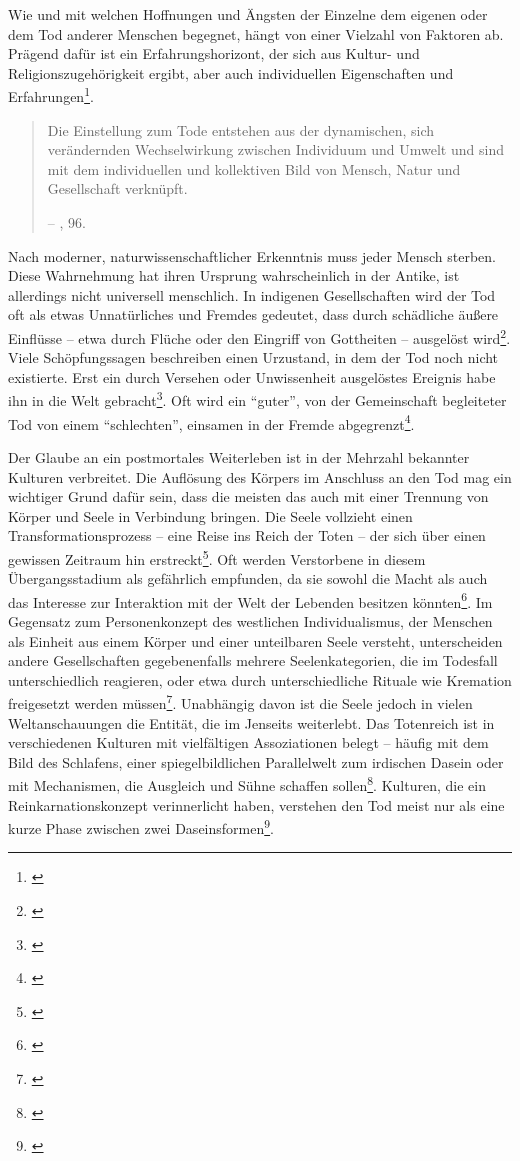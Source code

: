 \documentclass[openany,twoside,twocolumn]{book}
\let\rmarkdownfootnote\footnote%
\def\footnote{\protect\rmarkdownfootnote}
\begin{document}
Wie und mit welchen Hoffnungen und Ängsten der Einzelne dem eigenen oder
dem Tod anderer Menschen begegnet, hängt von einer Vielzahl von Faktoren
ab. Prägend dafür ist ein Erfahrungshorizont, der sich aus Kultur- und
Religionszugehörigkeit ergibt, aber auch individuellen Eigenschaften und
Erfahrungen\footnote{\textcite{mischke_umgang_1996}}.

\begin{quote}
Die Einstellung zum Tode entstehen aus der dynamischen, sich
verändernden Wechselwirkung zwischen Individuum und Umwelt und sind mit
dem individuellen und kollektiven Bild von Mensch, Natur und
Gesellschaft verknüpft.

-- \textcite{hofmann_rituelle_2008}, 96.
\end{quote}

Nach moderner, naturwissenschaftlicher Erkenntnis muss jeder Mensch
sterben. Diese Wahrnehmung hat ihren Ursprung wahrscheinlich in der
Antike, ist allerdings nicht universell menschlich. In indigenen
Gesellschaften wird der Tod oft als etwas Unnatürliches und Fremdes
gedeutet, dass durch schädliche äußere Einflüsse -- etwa durch Flüche
oder den Eingriff von Gottheiten -- ausgelöst wird\footnote{\textcite{condrau_mensch_1991}}.
Viele Schöpfungssagen beschreiben einen Urzustand, in dem der Tod noch
nicht existierte. Erst ein durch Versehen oder Unwissenheit ausgelöstes
Ereignis habe ihn in die Welt gebracht\footnote{\textcite{weis_zur_1986}}.
Oft wird ein ``guter'', von der Gemeinschaft begleiteter Tod von einem
``schlechten'', einsamen in der Fremde abgegrenzt\footnote{\textcite{bradbury_representations_1996}}.

Der Glaube an ein postmortales Weiterleben ist in der Mehrzahl bekannter
Kulturen verbreitet. Die Auflösung des Körpers im Anschluss an den Tod
mag ein wichtiger Grund dafür sein, dass die meisten das auch mit einer
Trennung von Körper und Seele in Verbindung bringen. Die Seele vollzieht
einen Transformationsprozess -- eine Reise ins Reich der Toten -- der
sich über einen gewissen Zeitraum hin erstreckt\footnote{\textcite{weis_zur_1986}}.
Oft werden Verstorbene in diesem Übergangsstadium als gefährlich
empfunden, da sie sowohl die Macht als auch das Interesse zur
Interaktion mit der Welt der Lebenden besitzen könnten\footnote{\textcite{drubig_geschichte_1994}}.
Im Gegensatz zum Personenkonzept des westlichen Individualismus, der
Menschen als Einheit aus einem Körper und einer unteilbaren Seele
versteht, unterscheiden andere Gesellschaften gegebenenfalls mehrere
Seelenkategorien, die im Todesfall unterschiedlich reagieren, oder etwa
durch unterschiedliche Rituale wie Kremation freigesetzt werden
müssen\footnote{\textcite{graslund_prehistoric_1994}}. Unabhängig davon
ist die Seele jedoch in vielen Weltanschauungen die Entität, die im
Jenseits weiterlebt. Das Totenreich ist in verschiedenen Kulturen mit
vielfältigen Assoziationen belegt -- häufig mit dem Bild des Schlafens,
einer spiegelbildlichen Parallelwelt zum irdischen Dasein oder mit
Mechanismen, die Ausgleich und Sühne schaffen sollen\footnote{\textcite{stubbe_trauerverhalten_1988}}.
Kulturen, die ein Reinkarnationskonzept verinnerlicht haben, verstehen
den Tod meist nur als eine kurze Phase zwischen zwei
Daseinsformen\footnote{\textcite{payer_stichwort_1998}}.
\end{document}
